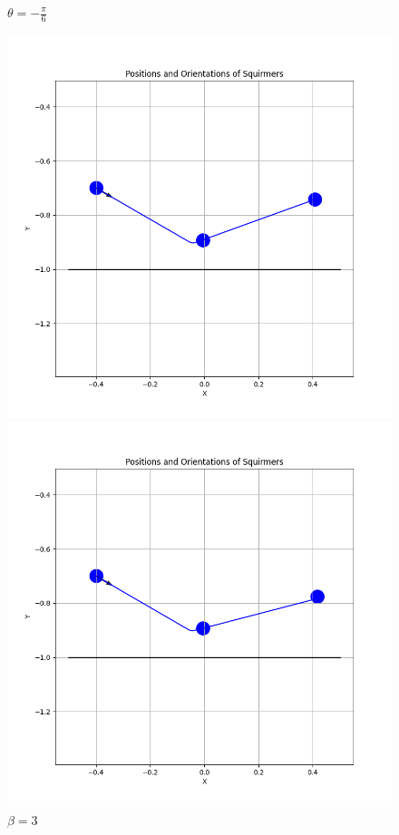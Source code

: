 \documentclass{article}
\begin{document}
 \begin{figure}[H]
    \centering
    \textbf{$\theta = -\frac{\pi}{6}$}\par\medskip
    \begin{minipage}{0.49\textwidth}
        \includegraphics[width=1.1\textwidth]{graphs/simulations/border/beta1_5/mpi_6.png}
        \caption{\footnotesize $\beta = 1.5$}
    \end{minipage}\hfill
    \begin{minipage}{0.49\textwidth}
        \includegraphics[width=1.1\textwidth]{graphs/simulations/border/beta3/mpi_6.png}
        \caption{\footnotesize $\beta = 3$}
    \end{minipage}
\end{figure}
\end{document}
